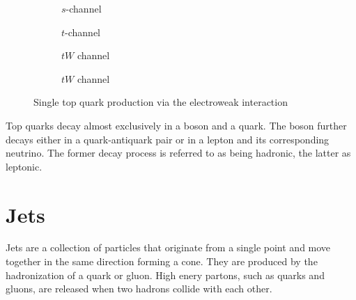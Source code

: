 \begin{figure}[h]
    \centering
    \begin{subfigure}[b]{0.2\textwidth}
        \centering
        
        \caption{$s$-channel}
        \label{fig:top_single_s}
    \end{subfigure}\hfill
    \begin{subfigure}[b]{0.2\textwidth}
        \centering
        
        \caption{$t$-channel}
        \label{fig:top_single_t}
    \end{subfigure}\hfill
    \begin{subfigure}[b]{0.2\textwidth}
        \centering
        
        \caption{$tW$ channel}
        \label{fig:top_single_tw_1}
    \end{subfigure}\hfill
    \begin{subfigure}[b]{0.2\textwidth}
        \centering
        \vfill
        
        \caption{$tW$ channel}
        \label{fig:top_single_tw_2}
    \end{subfigure}
    \caption{Single top quark production via the electroweak interaction}
    \label{fig:top_single}
\end{figure}

Top quarks decay almost exclusively in a \PW boson and a \Pbottom quark. The boson further decays either in a quark-antiquark pair or in a lepton and its corresponding neutrino. The former decay process is referred to as being hadronic, the latter as leptonic.

\section{Jets}
Jets are a collection of particles that originate from a single point and move together in the same direction forming a cone. They are produced by the hadronization of a quark or gluon. High enery partons, such as quarks and gluons, are released when two hadrons collide with each other.